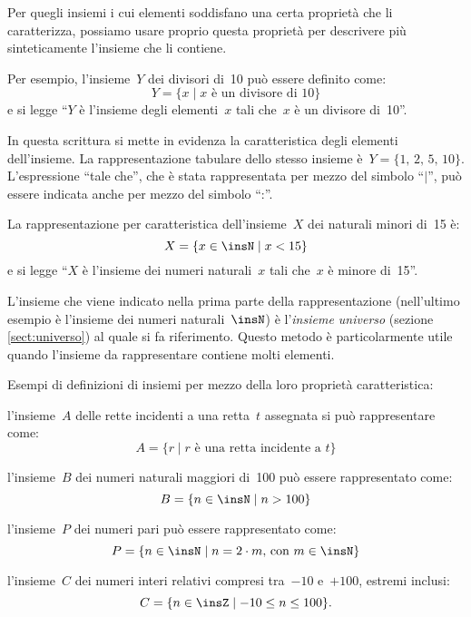 Per quegli insiemi i cui elementi soddisfano una certa proprietà che
li caratterizza, possiamo usare proprio questa proprietà per
descrivere più sinteticamente l'insieme che li contiene.

Per esempio, l'insieme~$Y$ dei divisori di~10 può essere definito come: \[Y=\{x\mid x \text{ è un divisore di }10\}\]
e si legge ``$Y$ è l'insieme degli elementi~$x$ tali che~$x$ è un divisore di~10''.

In questa scrittura si mette in evidenza la caratteristica degli elementi dell'insieme.
La rappresentazione tabulare dello stesso insieme è~$Y=\{\text{1, 2, 5, 10}\}$. L'espressione ``tale che'', che è stata rappresentata per mezzo del simbolo ``$|$'', può essere indicata anche per mezzo del simbolo ``:''.

La rappresentazione per caratteristica dell'insieme~$X$
dei naturali minori di~15 è: \[X=\{x\in\insN\mid x<15\}\]
e si legge ``$X$ è l'insieme dei numeri naturali~$x$ tali che~$x$ è minore di~15''.

L'insieme che viene indicato nella prima parte della rappresentazione (nell'ultimo esempio è
l'insieme dei numeri naturali~$\insN$) è l'\textit{insieme universo} (sezione \ref{sect:universo}) al quale si fa riferimento.
Questo metodo è particolarmente utile quando l'insieme da rappresentare contiene molti elementi.

\begin{exrig}
 \begin{esempio}
 Esempi di definizioni di insiemi per mezzo della loro proprietà caratteristica:
 \begin{enumeratea}
\item l'insieme~$A$ delle rette incidenti a una retta~$t$ assegnata si può rappresentare come:
\[A=\{r\mid r\text{ è una retta incidente a } t\}\]
\item l'insieme~$B$ dei numeri naturali maggiori di~100 può essere rappresentato come:
\[B=\{n\in\insN\mid n>100\}\]
\item l'insieme~$P$ dei numeri pari può essere rappresentato come:
\[P=\{n\in\insN\mid n=2\cdot m\text{, con }m\in\insN\}\]
\item l'insieme~$C$ dei numeri interi relativi compresi tra~$-10$ e~$+100$, estremi inclusi:
\[C=\{n\in\insZ\mid -10\le n\le 100\}.\]
\end{enumeratea}
 \end{esempio}
\end{exrig}

\ovalbox{\risolvii \ref{ese:5.19}, \ref{ese:5.20}, \ref{ese:5.21}, \ref{ese:5.22}, \ref{ese:5.23}, \ref{ese:5.24}, \ref{ese:5.25}, \ref{ese:5.26}, \ref{ese:5.27}, \ref{ese:5.28}, \ref{ese:5.29},\ref{ese:5.30}, \ref{ese:5.31},}


